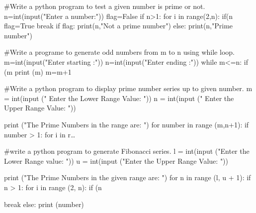 #Write a python program to test a given number is prime or not.
n=int(input("Enter a number:"))
flag=False
if n>1:
	for i in range(2,n):
		if(n%
			flag=True
			break
if flag:
	print(n,"Not a prime number")
else:
	print(n,"Prime number")

#Write a programe to generate odd numbers from m to n using while loop.
m=int(input("Enter starting :"))
n=int(input("Enter ending :"))
while m<=n:
	if (m%
		print (m)
	m=m+1

#Write a python program to display prime number series up to given number.
m = int(input (" Enter the Lower Range Value: "))  
n = int(input (" Enter the Upper Range Value: "))  
  
print ("The Prime Numbers in the range are: ")  
for number in range (m,n+1):  
    if number > 1:  
        for i in r…
		
#write a python program to generate Fibonacci series.
l = int(input ("Enter the Lower Range value: "))  
u = int(input ("Enter the Upper Range Value: "))  
  
print ("The Prime Numbers in the given range are: ")  
for n in range (l, u + 1):  
    if n > 1:  
        for i in range (2, n):  
            if (n %
            
                break  
        else:  
            print (number)
